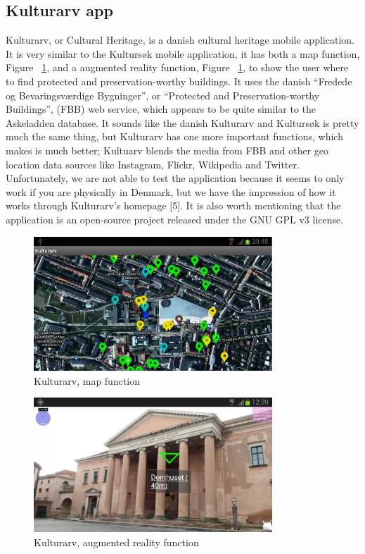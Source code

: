 \documentclass[11pt]{book}
\begin{document}
\subsection{Kulturarv app}
Kulturarv, or Cultural Heritage, is a danish cultural heritage mobile application. It is very similar to the Kultursøk mobile application, it has both a map function, Figure ~\ref{fig:pre_kulturArvAppMap}, and a augmented reality function, Figure ~\ref{fig:pre_kulturArvAppMap},  to show the user where to find protected and preservation-worthy buildings. It uses the danish “Fredede og Bevaringsværdige Bygninger”, or  “Protected and Preservation-worthy Buildings”, (FBB) web service, which appears to be quite similar to the Askeladden database. It sounds like the danish Kulturarv and Kultursøk is pretty much the same thing, but Kulturarv has one more important functions, which makes is much better; Kultuarv blends the media from FBB and other geo location data sources like Instagram, Flickr, Wikipedia and Twitter. Unfortunately, we are not able to test the application because it seems to only work if you are physically in Denmark, but we have the impression of how it works through Kulturarv’s homepage [5]. It is also worth  mentioning that the application is an open-source project released under the GNU GPL v3 license.

\begin{figure}[H]
      \centering
      \includegraphics[width=0.8\textwidth]{Figures/Prestudy/kulturArvMap.png}
      \caption{Kulturarv, map function}
      \label{fig:pre_kulturArvAppMap}
\end{figure}

\begin{figure}[H]
      \centering
      \includegraphics[width=0.8\textwidth]{Figures/Prestudy/kulturArvAR1.png}
      \caption{Kulturarv, augmented reality function}
      \label{fig:pre_kulturArvAppAug}
\end{figure}
\end{document}
